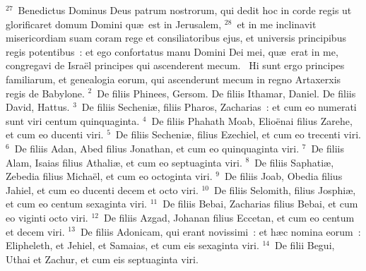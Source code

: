 ${}^{27}$~Benedictus Dominus Deus patrum nostrorum, qui dedit hoc in corde regis ut glorificaret domum Domini qu\ae\ est in Jerusalem,
${}^{28}$~et in me inclinavit misericordiam suam coram rege et consiliatoribus ejus, et universis principibus regis potentibus~: et ego confortatus manu Domini Dei mei, qu\ae\ erat in me, congregavi de Isra\"el principes qui ascenderent mecum.
~Hi sunt ergo principes familiarum, et genealogia eorum, qui ascenderunt mecum in regno Artaxerxis regis de Babylone.
${}^{2}$~De filiis Phinees, Gersom. De filiis Ithamar, Daniel. De filiis David, Hattus.
${}^{3}$~De filiis Secheni\ae , filiis Pharos, Zacharias~: et cum eo numerati sunt viri centum quinquaginta.
${}^{4}$~De filiis Phahath Moab, Elio\"enai filius Zarehe, et cum eo ducenti viri.
${}^{5}$~De filiis Secheni\ae , filius Ezechiel, et cum eo trecenti viri.
${}^{6}$~De filiis Adan, Abed filius Jonathan, et cum eo quinquaginta viri.
${}^{7}$~De filiis Alam, Isaias filius Athali\ae , et cum eo septuaginta viri.
${}^{8}$~De filiis Saphati\ae , Zebedia filius Micha\"el, et cum eo octoginta viri.
${}^{9}$~De filiis Joab, Obedia filius Jahiel, et cum eo ducenti decem et octo viri.
${}^{10}$~De filiis Selomith, filius Josphi\ae , et cum eo centum sexaginta viri.
${}^{11}$~De filiis Bebai, Zacharias filius Bebai, et cum eo viginti octo viri.
${}^{12}$~De filiis Azgad, Johanan filius Eccetan, et cum eo centum et decem viri.
${}^{13}$~De filiis Adonicam, qui erant novissimi~: et h\ae c nomina eorum~: Elipheleth, et Jehiel, et Samaias, et cum eis sexaginta viri.
${}^{14}$~De filii Begui, Uthai et Zachur, et cum eis septuaginta viri.


